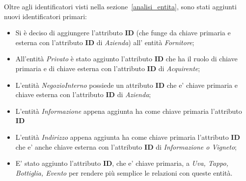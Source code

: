 Oltre agli identificatori visti nella sezione~\ref{analisi_entita}, sono stati aggiunti nuovi identificatori primari:

\begin{itemize}
	\item Si è deciso di aggiungere l'attributo \textbf{ID} (che funge da chiave primaria e esterna con l'attributo \textbf{ID} di \emph{Azienda}) all' entità \emph{Fornitore};
	\item All'entità \emph{Privato} è stato aggiunto l'attributo \textbf{ID} che ha il ruolo di chiave primaria e di chiave esterna con l'attributo \textbf{ID} di \emph{Acquirente};
	\item L'entità \emph{NegozioInterno} possiede un attributo \textbf{ID} che e' chiave primaria e chiave esterna con l'attributo \textbf{ID} di \emph{Azienda};
	\item L'entità \emph{Informazione} appena aggiunta ha come chiave primaria l'attributo \textbf{ID}
	\item L'entità \emph{Indirizzo} appena aggiunta ha come chiave primaria l'attributo \textbf{ID} che e' anche chiave esterna con l'attributo \textbf{ID} di \emph{Informazione o Vigneto};
	\item E' stato aggiunto l'attributo \textbf{ID}, che e' chiave primaria, a \emph{Uva, Tappo, Bottiglia, Evento} per rendere più semplice le relazioni con queste entità.
\end{itemize}